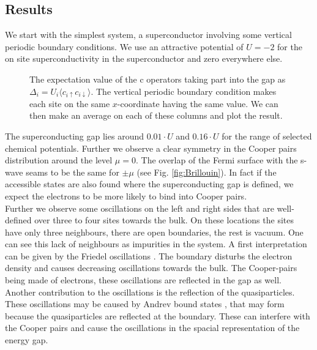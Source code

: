 \documentclass[..\main.tex]{subfile}
\begin{document}
\subsection{Results}
We start with the simplest system, a superconductor involving some vertical periodic boundary conditions.
We use an attractive potential of $U=-2$ for the on site superconductivity in the superconductor and zero everywhere else.
\begin{figure}[H]
  \centering
  
  \caption{The expectation value of the c operators taking part into the gap as $\Delta_i = U_i\langle c_{i\uparrow}c_{i\downarrow}\rangle$. The  
  vertical periodic boundary condition makes each site on the same $x$-coordinate having the same value.
    We can then make an average on each of these columns and plot the result.}
\end{figure}
The superconducting gap lies around $0.01\cdot U$ and $0.16\cdot U$ for the range of selected chemical potentials. Further we observe a 
clear symmetry in the Cooper pairs distribution around the level $\mu =0$. The overlap of the Fermi surface with the s-wave seams
to be the same for $\pm\mu$ (see Fig. \ref{fig:Brillouin}). In fact if the accessible states are also found where the superconducting gap 
is defined, we expect the electrons to be more likely to bind into Cooper pairs.\\   
Further we observe some oscillations on the left and right sides that are well-defined over three to four sites towards the bulk. On these locations the sites have only three
neighbours, there are open boundaries, the rest is vacuum. One can see this lack of neighbours as impurities in the system. 
A first interpretation can be given by the Friedel oscillations \cite{Harrison1970}. The boundary disturbs the electron density and causes decreasing oscillations towards
the bulk. The Cooper-pairs being made of electrons, these oscillations are reflected in the gap as well. Another contribution to the oscillations
is the reflection of the quasiparticles.
These oscillations may be caused by Andrev bound states \cite{Bobkov_2024}, that may form because the quasiparticles are reflected at the boundary.
These can interfere with the Cooper pairs and cause the oscillations in the spacial representation of the energy gap.\\
\end{document}
